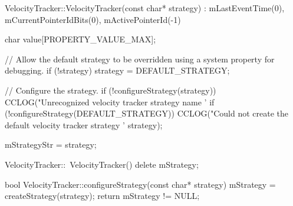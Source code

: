 VelocityTracker::VelocityTracker(const char* strategy) :
mLastEventTime(0), mCurrentPointerIdBits(0), mActivePointerId(-1) {
    char value[PROPERTY_VALUE_MAX];
    
    // Allow the default strategy to be overridden using a system property for debugging.
    if (!strategy) {
        strategy = DEFAULT_STRATEGY;
    }
    
    // Configure the strategy.
    if (!configureStrategy(strategy)) {
        CCLOG("Unrecognized velocity tracker strategy name '%
        if (!configureStrategy(DEFAULT_STRATEGY)) {
            CCLOG("Could not create the default velocity tracker strategy '%
                             strategy);
        }
    }
    
    mStrategyStr = strategy;
}

VelocityTracker::~VelocityTracker() {
    delete mStrategy;
}

bool VelocityTracker::configureStrategy(const char* strategy) {
    mStrategy = createStrategy(strategy);
    return mStrategy != NULL;
}

